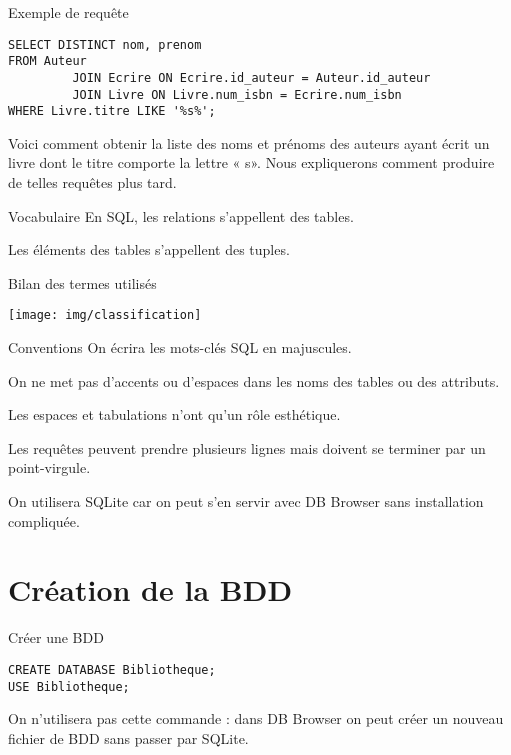 \documentclass[10pt]{nsibeamer}
\begin{document}
\begin{frame}[fragile]{Exemple de requête}
    
    \footnotesize
    
    \begin{verbatim}
SELECT DISTINCT nom, prenom
FROM Auteur
         JOIN Ecrire ON Ecrire.id_auteur = Auteur.id_auteur
         JOIN Livre ON Livre.num_isbn = Ecrire.num_isbn
WHERE Livre.titre LIKE '%s%';
\end{verbatim}
    
    \normalsize\pause
    Voici comment obtenir la liste des noms et prénoms des auteurs ayant écrit un livre dont le titre comporte la lettre « s». Nous expliquerons comment produire de telles requêtes plus tard.
\end{frame}
\begin{frame}{Vocabulaire}
    En SQL, les relations s'appellent des \alert{tables}.\\\pause
    
    Les éléments des tables s'appellent des \alert{tuples}.
\end{frame}
\begin{frame}{Bilan des termes utilisés}
    \begin{center}
        \texttt{[image: img/classification]}
    \end{center}
\end{frame}
\begin{frame}{Conventions}
    On écrira les mots-clés SQL en majuscules.\\\pause
    
    On ne met pas d'accents ou d'espaces dans les noms des tables ou des attributs.\\\pause
    
    Les espaces et tabulations n'ont qu'un rôle esthétique.\\\pause
    
    Les requêtes peuvent prendre plusieurs lignes mais doivent se terminer par un point-virgule.\\\pause
    
    On utilisera SQLite car on peut s'en servir avec DB Browser sans installation compliquée.
\end{frame}
\section{Création de la BDD}
\begin{frame}[fragile]{Créer une BDD}
    
    \begin{verbatim}
CREATE DATABASE Bibliotheque;
USE Bibliotheque;
\end{verbatim}
    \pause
    On n'utilisera pas cette commande : dans DB	Browser on peut créer un nouveau fichier de BDD sans passer par SQLite.
\end{frame}
\end{document}
